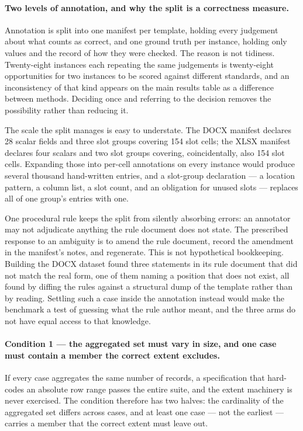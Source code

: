 \paragraph{Two levels of annotation, and why the split is a correctness measure.}
Annotation is split into one manifest per template, holding every judgement about what counts
as correct, and one ground truth per instance, holding only values and the record of how they
were checked. The reason is not tidiness. Twenty-eight instances each repeating the same
judgements is twenty-eight opportunities for two instances to be scored against different
standards, and an inconsistency of that kind appears on the main results table as a difference
between methods. Deciding once and referring to the decision removes the possibility rather
than reducing it.

The scale the split manages is easy to understate. The DOCX manifest declares 28 scalar fields
and three slot groups covering 154 slot cells; the XLSX manifest declares four scalars and two
slot groups covering, coincidentally, also 154 slot cells. Expanding those into per-cell
annotations on every instance would produce several thousand hand-written entries, and a
slot-group declaration --- a location pattern, a column list, a slot count, and an obligation
for unused slots --- replaces all of one group's entries with one.

One procedural rule keeps the split from silently absorbing errors: an annotator may not
adjudicate anything the rule document does not state. The prescribed response to an ambiguity
is to amend the rule document, record the amendment in the manifest's notes, and regenerate.
This is not hypothetical bookkeeping. Building the DOCX dataset found three statements in its
rule document that did not match the real form, one of them naming a position that does not
exist, all found by diffing the rules against a structural dump of the template rather than by
reading. Settling such a case inside the annotation instead would make the benchmark a test of
guessing what the rule author meant, and the three arms do not have equal access to that
knowledge.

\paragraph{Condition 1 --- the aggregated set must vary in size, and one case must contain a
member the correct extent excludes.}
If every case aggregates the same number of records, a specification that hard-codes an
absolute row range passes the entire suite, and the extent machinery is never exercised. The
condition therefore has two halves: the cardinality of the aggregated set differs across cases,
and at least one case --- not the earliest --- carries a member that the correct extent must
leave out.


